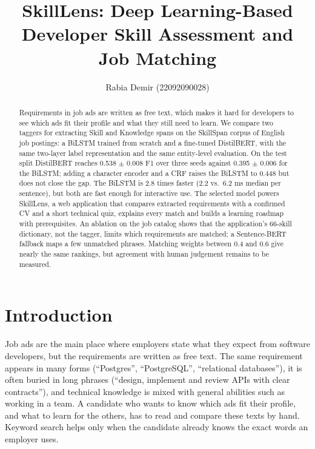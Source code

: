 \documentclass[runningheads]{llncs}
\newcommand{\yaz}[1]{\textcolor{red}{\textbf{[YAZ:} #1\textbf{]}}}
\begin{document}
\title{SkillLens: Deep Learning-Based Developer Skill Assessment and Job Matching}
\author{Rabia Demir (22092090028)}
\institute{\yaz{Bölüm, Üniversite, e-posta}}
\maketitle

\begin{abstract}
Requirements in job ads are written as free text, which makes it hard for developers to see which ads
fit their profile and what they still need to learn. We compare two taggers for extracting Skill and
Knowledge spans on the SkillSpan corpus of English job postings: a BiLSTM trained from scratch and a
fine-tuned DistilBERT, with the same two-layer label representation and the same entity-level
evaluation. On the test split DistilBERT reaches 0.538 $\pm$ 0.008 F1 over three seeds against
0.395 $\pm$ 0.006 for the BiLSTM; adding a character encoder and a CRF raises the BiLSTM to 0.448 but
does not close the gap. The BiLSTM is 2.8 times faster (2.2 vs.\ 6.2 ms median per sentence), but
both are fast enough for interactive use. The selected model powers SkillLens, a web application that
compares extracted requirements with a confirmed CV and a short technical quiz, explains every match
and builds a learning roadmap with prerequisites. An ablation on the job catalog shows that the
application's 66-skill dictionary, not the tagger, limits which requirements are matched; a
Sentence-BERT fallback maps a few unmatched phrases. Matching weights between 0.4 and 0.6 give nearly
the same rankings, but agreement with human judgement remains to be measured.
\end{abstract}

\section{Introduction}
Job ads are the main place where employers state what they expect from software developers, but the
requirements are written as free text. The same requirement appears in many forms (``Postgres'',
``PostgreSQL'', ``relational databases''), it is often buried in long phrases (``design, implement and
review APIs with clear contracts''), and technical knowledge is mixed with general abilities such as
working in a team. A candidate who wants to know which ads fit their profile, and what to learn for the
others, has to read and compare these texts by hand. Keyword search helps only when the candidate
already knows the exact words an employer uses.
\end{document}
